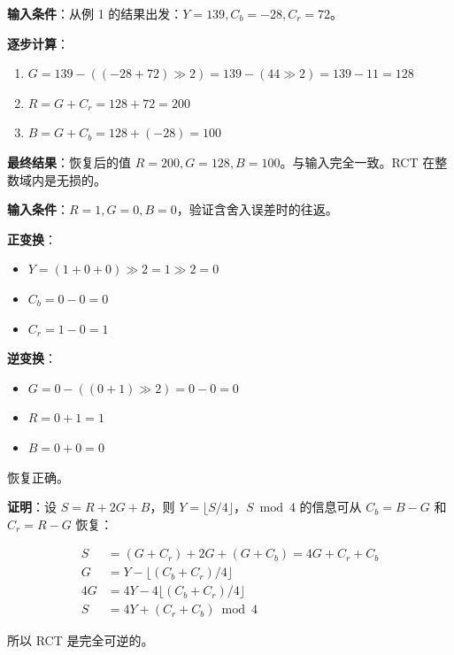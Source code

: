 \begin{examplebox}[title={例 2：RCT 逆变换}]

\textbf{输入条件}：从例 1 的结果出发：$Y = 139, C_b = -28, C_r = 72$。

\medskip
\textbf{逐步计算}：

\begin{enumerate}
  \item $G = 139 - ((-28 + 72) \gg 2) = 139 - (44 \gg 2) = 139 - 11 = 128$
  \item $R = G + C_r = 128 + 72 = 200$
  \item $B = G + C_b = 128 + (-28) = 100$
\end{enumerate}

\medskip
\textbf{最终结果}：恢复后的值 $R = 200, G = 128, B = 100$。与输入完全一致。RCT 在整数域内是无损的。
\end{examplebox}

\begin{examplebox}[title={例 3：RCT 无损性证明}]

\textbf{输入条件}：$R = 1, G = 0, B = 0$，验证含舍入误差时的往返。

\medskip
\textbf{正变换}：
\begin{itemize}
  \item $Y = (1 + 0 + 0) \gg 2 = 1 \gg 2 = 0$
  \item $C_b = 0 - 0 = 0$
  \item $C_r = 1 - 0 = 1$
\end{itemize}

\textbf{逆变换}：
\begin{itemize}
  \item $G = 0 - ((0 + 1) \gg 2) = 0 - 0 = 0$
  \item $R = 0 + 1 = 1$
  \item $B = 0 + 0 = 0$
\end{itemize}

恢复正确。

\medskip
\textbf{证明}：设 $S = R + 2G + B$，则 $Y = \lfloor S/4 \rfloor$，$S \bmod 4$ 的信息可从 $C_b = B - G$ 和 $C_r = R - G$ 恢复：

\begin{align*}
S &= (G + C_r) + 2G + (G + C_b) = 4G + C_r + C_b \\
G &= Y - \lfloor (C_b + C_r) / 4 \rfloor \\
4G &= 4Y - 4\lfloor (C_b + C_r) / 4 \rfloor \\
S &= 4Y + (C_r + C_b) \bmod 4
\end{align*}

所以 RCT 是完全可逆的。
\end{examplebox}
